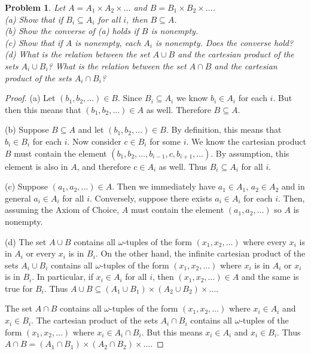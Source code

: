 \documentclass{article}
\newtheorem{problem}{Problem}
\begin{document}
\begin{problem}
Let $A = A_1 \times A_2 \times \dots$ and $B = B_1 \times B_2 \times \dots$.\\
(a) Show that if $B_i \subseteq A_i$ for all $i$, then $B \subseteq A$.\\
(b) Show the converse of (a) holds if $B$ is nonempty.\\
(c) Show that if $A$ is nonempty, each $A_i$ is nonempty. Does the converse hold?\\
(d) What is the relation between the set $A \cup B$ and the cartesian product of the sets $A_i \cup B_i$? What is the relation between the set $A \cap B$ and the cartesian product of the sets $A_i \cap B_i$?
\end{problem}
\begin{proof}
(a) Let $(b_1, b_2, \dots ) \in B$. Since $B_i \subseteq A_i$ we know $b_i \in A_i$ for each $i$. But then this means that $(b_1, b_2, \dots ) \in A$ as well. Therefore $B \subseteq A$.

(b) Suppose $B \subseteq A$ and let $(b_1, b_2, \dots ) \in B$. By definition, this means that $b_i \in B_i$ for each $i$. Now consider $c \in B_i$ for some $i$. We know the cartesian product $B$ must contain the element $(b_1, b_2, \dots , b_{i-1}, c, b_{i+1}, \dots )$. By assumption, this element is also in $A$, and therefore $c \in A_i$ as well. Thus $B_i \subseteq A_i$ for all $i$.

(c) Suppose $(a_1, a_2, \dots ) \in A$. Then we immediately have $a_1 \in A_1$, $a_2 \in A_2$ and in general $a_i \in A_i$ for all $i$. Conversely, suppose there exists $a_i \in A_i$ for each $i$. Then, assuming the Axiom of Choice, $A$ must contain the element $(a_1, a_2, \dots )$ so $A$ is nonempty.

(d) The set $A \cup B$ contains all $\omega$-tuples of the form $(x_1, x_2, \dots )$ where every $x_i$ is in $A_i$ or every $x_i$ is in $B_i$. On the other hand, the infinite cartesian product of the sets $A_i \cup B_i$ contains all $\omega$-tuples of the form $(x_1, x_2, \dots )$ where $x_i$ is in $A_i$ or $x_i$ is in $B_i$. In particular, if $x_i \in A_i$ for all $i$, then $(x_1, x_2, \dots ) \in A$ and the same is true for $B_i$. Thus $A \cup B \subseteq (A_1 \cup B_1) \times (A_2 \cup B_2) \times \dots$.

The set $A \cap B$ contains all $\omega$-tuples of the form $(x_1, x_2, \dots )$ where $x_i \in A_i$ and $x_i \in B_i$. The cartesian product of the sets $A_i \cap B_i$ contains all $\omega$-tuples of the form $(x_1, x_2, \dots )$ where $x_i \in A_i \cap B_i$. But this means $x_i \in A_i$ and $x_i \in B_i$. Thus $A \cap B = (A_1 \cap B_1) \times (A_2 \cap B_2) \times \dots$.
\end{proof}
\end{document}
